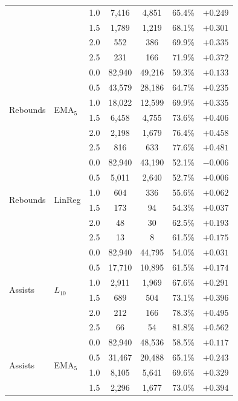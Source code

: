 \documentclass[12pt, letterpaper]{article}
\begin{document}
\begin{table}[H]
\begin{tabular}{llccccc}
  & & 1.0 &  7,416 &  4,851 & 65.4\% & $+0.249$ \\
  & & 1.5 &  1,789 &  1,219 & 68.1\% & $+0.301$ \\
  & & 2.0 &    552 &    386 & 69.9\% & $+0.335$ \\
  & & 2.5 &    231 &    166 & 71.9\% & $+0.372$ \\
\midrule
\multirow{6}{*}{Rebounds}
  & \multirow{6}{*}{EMA$_5$}
    & 0.0 & 82,940 & 49,216 & 59.3\% & $+0.133$ \\
  & & 0.5 & 43,579 & 28,186 & 64.7\% & $+0.235$ \\
  & & 1.0 & 18,022 & 12,599 & 69.9\% & $+0.335$ \\
  & & 1.5 &  6,458 &  4,755 & 73.6\% & $+0.406$ \\
  & & 2.0 &  2,198 &  1,679 & 76.4\% & $+0.458$ \\
  & & 2.5 &    816 &    633 & 77.6\% & $+0.481$ \\
\midrule
\multirow{6}{*}{Rebounds}
  & \multirow{6}{*}{LinReg}
    & 0.0 & 82,940 & 43,190 & 52.1\% & $-0.006$ \\
  & & 0.5 &  5,011 &  2,640 & 52.7\% & $+0.006$ \\
  & & 1.0 &    604 &    336 & 55.6\% & $+0.062$ \\
  & & 1.5 &    173 &     94 & 54.3\% & $+0.037$ \\
  & & 2.0 &     48 &     30 & 62.5\% & $+0.193$ \\
  & & 2.5 &     13 &      8 & 61.5\% & $+0.175$ \\
\midrule
\multirow{6}{*}{Assists}
  & \multirow{6}{*}{$L_{10}$}
    & 0.0 & 82,940 & 44,795 & 54.0\% & $+0.031$ \\
  & & 0.5 & 17,710 & 10,895 & 61.5\% & $+0.174$ \\
  & & 1.0 &  2,911 &  1,969 & 67.6\% & $+0.291$ \\
  & & 1.5 &    689 &    504 & 73.1\% & $+0.396$ \\
  & & 2.0 &    212 &    166 & 78.3\% & $+0.495$ \\
  & & 2.5 &     66 &     54 & 81.8\% & $+0.562$ \\
\midrule
\multirow{6}{*}{Assists}
  & \multirow{6}{*}{EMA$_5$}
    & 0.0 & 82,940 & 48,536 & 58.5\% & $+0.117$ \\
  & & 0.5 & 31,467 & 20,488 & 65.1\% & $+0.243$ \\
  & & 1.0 &  8,105 &  5,641 & 69.6\% & $+0.329$ \\
  & & 1.5 &  2,296 &  1,677 & 73.0\% & $+0.394$ \\

\end{tabular}
\end{table}
\end{document}
